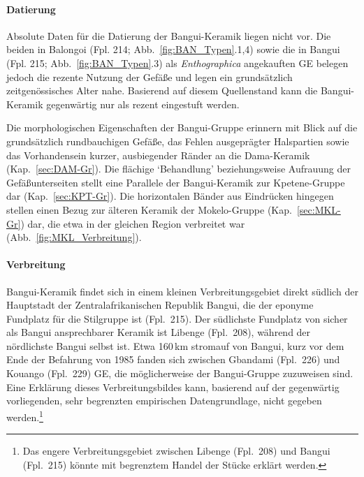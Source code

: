 \paragraph{Datierung}
$\;$ \\
Absolute Daten für die Datierung der Bangui-Keramik liegen nicht vor. Die beiden in Balongoi (Fpl. 214; Abb.~\ref{fig:BAN_Typen}.1,4) sowie die in Bangui (Fpl. 215; Abb.~\ref{fig:BAN_Typen}.3) als \textit{Enthographica} angekauften GE belegen jedoch die rezente Nutzung der Gefäße und legen ein grundsätzlich zeitgenössisches Alter nahe. Basierend auf diesem Quellenstand kann die Bangui-Keramik gegenwärtig nur als rezent eingestuft werden.

Die morphologischen Eigenschaften der Bangui-Gruppe erinnern mit Blick auf die grundsätzlich rundbauchigen Gefäße, das Fehlen ausgeprägter Halspartien sowie das Vorhandensein kurzer, ausbiegender Ränder an die Dama-Keramik (Kap.~\ref{sec:DAM-Gr}). Die flächige \enquote*{Behandlung} beziehungsweise Aufrauung der Gefäßunterseiten stellt eine Parallele der Bangui-Keramik zur Kpetene-Gruppe dar (Kap.~\ref{sec:KPT-Gr}). Die horizontalen Bänder aus Eindrücken hingegen stellen einen Bezug zur älteren Keramik der Mokelo-Gruppe (Kap.~\ref{sec:MKL-Gr}) dar, die etwa in der gleichen Region verbreitet war (Abb.~\ref{fig:MKL_Verbreitung}).

\paragraph{Verbreitung}
$\;$ \\
Bangui-Keramik findet sich in einem kleinen Verbreitungsgebiet direkt südlich der Hauptstadt der Zentralafrikanischen Republik Bangui, die der eponyme Fundplatz für die Stilgruppe ist (Fpl.~215). Der südlichste Fundplatz von sicher als Bangui ansprechbarer Keramik ist Libenge (Fpl.~208), während der nördlichste Bangui selbst ist. Etwa 160\,km stromauf von Bangui, kurz vor dem Ende der Befahrung von 1985 fanden sich zwischen Gbandami (Fpl.~226) und Kouango (Fpl.~229) GE, die möglicherweise der Bangui-Gruppe zuzuweisen sind. Eine Erklärung dieses Verbreitungsbildes kann, basierend auf der gegenwärtig vorliegenden, sehr begrenzten empirischen Datengrundlage, nicht gegeben werden.\footnote{Das engere Verbreitungsgebiet zwischen Libenge (Fpl.~208) und Bangui (Fpl.~215) könnte mit begrenztem Handel der Stücke erklärt werden.}